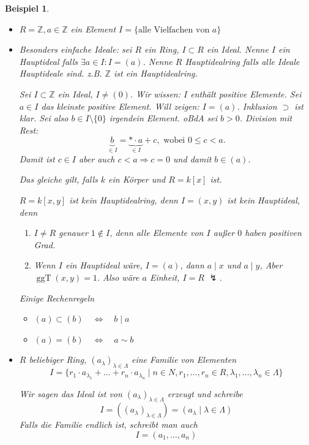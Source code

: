\documentclass[a4paper,12pt,numbers=noenddot,parskip=full]{scrartcl}
\newcommand{\setZ}{\mathbb{Z}}
\theoremstyle{dotless}
\newtheorem{example}[theorem]{Beispiel}
\theoremstyle{remark}
\begin{document}
	\begin{example}
		\begin{itemize}
			\item $R = \setZ, a \in \setZ$ ein Element $I = \{ \text{alle Vielfachen von $a$} \}$
			\item Besonders einfache Ideale: sei $R$ ein Ring, $I \subset R$ ein Ideal. Nenne $I$ ein Hauptideal falls $\exists a \in I: I = (a)$. Nenne $R$ Hauptidealring falls alle Ideale Hauptideale sind. z.B. $\setZ$ ist ein Hauptidealring.
			
			Sei $I \subset \setZ$ ein Ideal, $I \neq (0)$. Wir wissen: $I$ enthält positive Elemente. Sei $a \in I$ das kleinste positive Element. Will zeigen: $I = (a)$. Inklusion $\supset$ ist klar. Sei also $b \in I \setminus \{ 0 \}$ irgendein Element. oBdA sei $b > 0$. Division mit Rest:
			\begin{equation*}
				\underbrace{b}_{\in I} = \underbrace{* \cdot a}_{\in I} + c, \text{ wobei } 0 \leq c < a.
			\end{equation*}
			Damit ist $c \in I$ aber auch $c < a \Rightarrow c = 0$ und damit $b \in (a)$.
			
			Das gleiche gilt, falls $k$ ein Körper und $R = k[x]$ ist.
			
			$R = k[x,y]$ ist kein Hauptidealring, denn $I = (x,y)$ ist kein Hauptideal, denn
			\begin{enumerate}
				\item $I \neq R$ genauer $1 \notin I$, denn alle Elemente von $I$ außer $0$ haben positiven Grad.
				\item Wenn $I$ ein Hauptideal wäre, $I = (a)$, dann $a \mid x$ und $a \mid y$, Aber $\operatorname{ggT}(x,y) = 1$. Also wäre $a$ Einheit, $I = R$ $\lightning$.
			\end{enumerate}
		
			Einige Rechenregeln
			\begin{itemize}
				\item $(a) \subset (b) \quad\Leftrightarrow\quad b \mid a$
				\item $(a) = (b) \quad\Leftrightarrow\quad a \sim b$
			\end{itemize}
						
			\item $R$ beliebiger Ring, $(a_\lambda)_{\lambda \in \Lambda}$ eine Familie von Elementen
			\begin{equation*}
				I = \{ r_1 \cdot a_{\lambda_1} + \dots + r_n \cdot a_{\lambda_n} \mid n \in N, r_1, \dots, r_n \in R, \lambda_1, \dots, \lambda_n \in \Lambda \}
			\end{equation*}
			
			Wir sagen das Ideal ist von $(a_\lambda)_{\lambda \in \Lambda}$ erzeugt und schreibe
			\begin{equation*}
				I = ((a_\lambda)_{\lambda \in \Lambda}) = (a_\lambda \mid \lambda \in \Lambda)
			\end{equation*}
			Falls die Familie endlich ist, schreibt man auch
			\begin{equation*}
				I = (a_1, \dots, a_n)
			\end{equation*}
		\end{itemize}
	\end{example}
\end{document}
